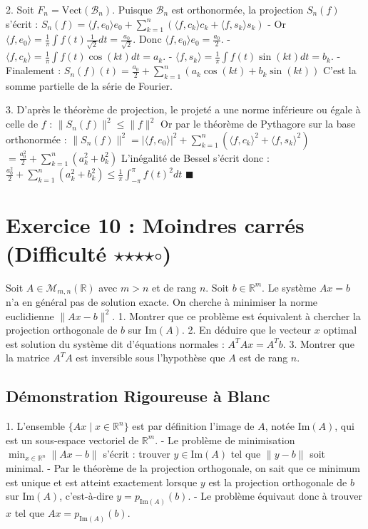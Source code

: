 \documentclass{report}
\begin{document}
2. Soit $F_n = \text{Vect}(\mathcal{B}_n)$. Puisque $\mathcal{B}_n$ est orthonormée, la projection $S_n(f)$ s'écrit :
   $ S_n(f) = \langle f, e_0 \rangle e_0 + \sum_{k=1}^n (\langle f, c_k \rangle c_k + \langle f, s_k \rangle s_k) $
   - Or $\langle f, e_0 \rangle = \frac{1}{\pi} \int f(t)\frac{1}{\sqrt{2}} dt = \frac{a_0}{\sqrt{2}}$. Donc $\langle f, e_0 \rangle e_0 = \frac{a_0}{2}$.
   - $\langle f, c_k \rangle = \frac{1}{\pi} \int f(t)\cos(kt) dt = a_k$.
   - $\langle f, s_k \rangle = \frac{1}{\pi} \int f(t)\sin(kt) dt = b_k$.
   - Finalement :
     $ S_n(f)(t) = \frac{a_0}{2} + \sum_{k=1}^n (a_k \cos(kt) + b_k \sin(kt)) $
   C'est la somme partielle de la série de Fourier.

3. D'après le théorème de projection, le projeté a une norme inférieure ou égale à celle de $f$ :
   $ \|S_n(f)\|^2 \le \|f\|^2 $
   Or par le théorème de Pythagore sur la base orthonormée :
   $ \|S_n(f)\|^2 = |\langle f, e_0 \rangle|^2 + \sum_{k=1}^n (\langle f, c_k \rangle^2 + \langle f, s_k \rangle^2) $
   $ = \frac{a_0^2}{2} + \sum_{k=1}^n (a_k^2 + b_k^2) $
   L'inégalité de Bessel s'écrit donc :
   $ \frac{a_0^2}{2} + \sum_{k=1}^n (a_k^2 + b_k^2) \le \frac{1}{\pi} \int_{-\pi}^\pi f(t)^2 dt $
   $\blacksquare$

\newpage


\chapter*{Exercice 10 : Moindres carrés (Difficulté $\star$$\star$$\star$$\star$$\circ$)}

Soit $A \in \mathcal{M}_{m,n}(\mathbb{R})$ avec $m > n$ et de rang $n$. Soit $b \in \mathbb{R}^m$. Le système $Ax = b$ n'a en général pas de solution exacte.
On cherche à minimiser la norme euclidienne $\|Ax - b\|^2$.
1. Montrer que ce problème est équivalent à chercher la projection orthogonale de $b$ sur $\text{Im}(A)$.
2. En déduire que le vecteur $x$ optimal est solution du système dit d'équations normales : $A^T A x = A^T b$.
3. Montrer que la matrice $A^T A$ est inversible sous l'hypothèse que $A$ est de rang $n$.

\section*{Démonstration Rigoureuse à Blanc}

1. L'ensemble $\{Ax \mid x \in \mathbb{R}^n\}$ est par définition l'image de $A$, notée $\text{Im}(A)$, qui est un sous-espace vectoriel de $\mathbb{R}^m$.
   - Le problème de minimisation $\min_{x \in \mathbb{R}^n} \|Ax - b\|$ s'écrit : trouver $y \in \text{Im}(A)$ tel que $\|y - b\|$ soit minimal.
   - Par le théorème de la projection orthogonale, on sait que ce minimum est unique et est atteint exactement lorsque $y$ est la projection orthogonale de $b$ sur $\text{Im}(A)$, c'est-à-dire $y = p_{\text{Im}(A)}(b)$.
   - Le problème équivaut donc à trouver $x$ tel que $Ax = p_{\text{Im}(A)}(b)$.
\end{document}
